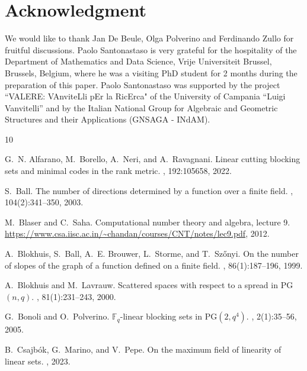 \documentclass[11pt]{article}
\theoremstyle{definition}
\begin{document}
\section*{Acknowledgment}
We would like to thank Jan De Beule, Olga Polverino and Ferdinando Zullo for fruitful
discussions.
Paolo Santonastaso is very grateful for the hospitality of the
Department of Mathematics and Data Science, Vrije Universiteit Brussel, Brussels, Belgium, where he was a visiting PhD student for 2 months during the preparation of this paper.
Paolo Santonastaso was supported by the project ``VALERE: VAnviteLli pEr la RicErca" of the University of Campania ``Luigi Vanvitelli'' and by the Italian National Group for Algebraic and Geometric Structures and their Applications (GNSAGA - INdAM).



\begin{thebibliography}{10}

G.~N. Alfarano, M.~Borello, A.~Neri, and A.~Ravagnani.
\newblock Linear cutting blocking sets and minimal codes in the rank metric.
, 192:105658, 2022.

S.~Ball.
\newblock The number of directions determined by a function over a finite
  field.
, 104(2):341--350,
  2003.

M.~Blaser and C.~Saha.
\newblock Computational number theory and algebra, lecture 9.
\newblock \url{https://www.csa.iisc.ac.in/~chandan/courses/CNT/notes/lec9.pdf},
  2012.

A.~Blokhuis, S.~Ball, A.~E. Brouwer, L.~Storme, and T.~Sz{\H{o}}nyi.
\newblock On the number of slopes of the graph of a function defined on a
  finite field.
, 86(1):187--196,
  1999.

A.~Blokhuis and M.~Lavrauw.
\newblock Scattered spaces with respect to a spread in {PG}$(n,q)$.
, 81(1):231--243, 2000.

G.~Bonoli and O.~Polverino.
\newblock $\mathbb{F}_q$-linear blocking sets in $\mathrm{PG}(2,q^4)$.
, 2(1):35--56, 2005.

B.~Csajb{\'o}k, G.~Marino, and V.~Pepe.
\newblock On the maximum field of linearity of linear sets.
, 2023.


\end{thebibliography}
\end{document}
